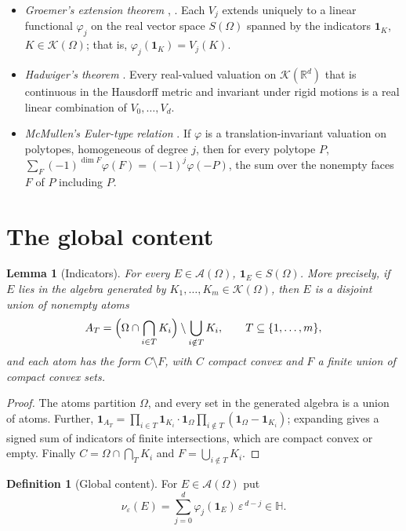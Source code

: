 \documentclass[11pt]{article}
\newtheorem{lemma}[theorem]{Lemma}
\theoremstyle{definition}
\newtheorem{definition}[theorem]{Definition}
\theoremstyle{remark}
\newcommand{\R}{\mathbb R}
\newcommand{\eps}{\varepsilon}
\newcommand{\HH}{\mathbb H}
\newcommand{\KK}{\mathcal K}
\newcommand{\A}{\mathcal A}
\newcommand{\nuE}{\nu_{\eps}}
\begin{document}
\begin{itemize}
\item[\textbf{(G)}] \emph{Groemer's extension theorem}
\cite[Ch.~6]{schneider}, \cite{klainrota}. Each $V_j$ extends uniquely
to a linear functional $\varphi_j$ on the real vector space $S(\Omega)$
spanned by the indicators $\mathbf 1_K$, $K\in\KK(\Omega)$; that is,
$\varphi_j(\mathbf 1_K)=V_j(K)$.
\item[\textbf{(H)}] \emph{Hadwiger's theorem} \cite{hadwiger,klainrota}.
Every real-valued valuation on $\KK(\R^d)$ that is continuous in the
Hausdorff metric and invariant under rigid motions is a real linear
combination of $V_0,\dots,V_d$.
\item[\textbf{(M)}] \emph{McMullen's Euler-type relation}
\cite{mcmullen}. If $\varphi$ is a translation-invariant valuation on
polytopes, homogeneous of degree $j$, then for every polytope $P$,
$\sum_{F}(-1)^{\dim F}\varphi(F)=(-1)^j\varphi(-P)$, the sum over the
nonempty faces $F$ of $P$ including $P$.
\end{itemize}

\section{The global content}

\begin{lemma}[Indicators]\label{lem:ind}
For every $E\in\A(\Omega)$, $\mathbf 1_E\in S(\Omega)$. More precisely,
if $E$ lies in the algebra generated by $K_1,\dots,K_m\in\KK(\Omega)$,
then $E$ is a disjoint union of nonempty \emph{atoms}
\[
 A_T=\Bigl(\Omega\cap\bigcap_{i\in T}K_i\Bigr)\setminus
     \bigcup_{i\notin T}K_i ,\qquad T\subseteq\{1,\dots,m\},
\]
and each atom has the form $C\setminus F$, with $C$ compact convex and
$F$ a finite union of compact convex sets.
\end{lemma}
\begin{proof}
The atoms partition $\Omega$, and every set in the generated algebra is a
union of atoms. Further,
$\mathbf 1_{A_T}=\prod_{i\in T}\mathbf 1_{K_i}\cdot\mathbf 1_\Omega
 \prod_{i\notin T}(\mathbf 1_\Omega-\mathbf 1_{K_i})$; expanding gives a
signed sum of indicators of finite intersections, which are compact
convex or empty. Finally $C=\Omega\cap\bigcap_{T}K_i$ and
$F=\bigcup_{i\notin T}K_i$.
\end{proof}

\begin{definition}[Global content]
For $E\in\A(\Omega)$ put
\[
 \nuE(E)=\sum_{j=0}^{d}\varphi_j(\mathbf 1_E)\,\eps^{\,d-j}\in\HH .
\]
\end{definition}
\end{document}
